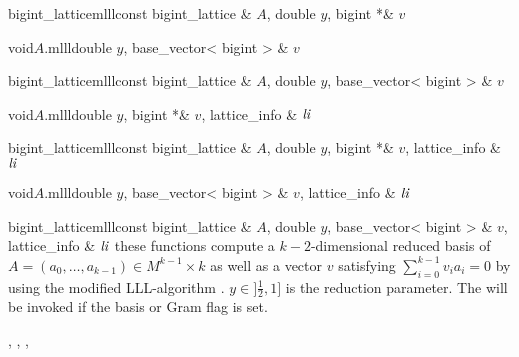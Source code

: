\begin{fcode}{bigint_lattice}{mlll}{const bigint_lattice & $A$, double $y$, bigint *& $v$}
\end{fcode}

\begin{fcode}{void}{$A$.mlll}{double $y$, base_vector< bigint > & $v$}
\end{fcode}

\begin{fcode}{bigint_lattice}{mlll}{const bigint_lattice & $A$, double $y$, base_vector< bigint > & $v$}
\end{fcode}

\begin{fcode}{void}{$A$.mlll}{double $y$, bigint *& $v$, lattice_info & $\mathit{li}$}
\end{fcode}

\begin{fcode}{bigint_lattice}{mlll}{const bigint_lattice & $A$, double $y$, bigint *& $v$,
    lattice_info & $\mathit{li}$}%
\end{fcode}

\begin{fcode}{void}{$A$.mlll}{double $y$, base_vector< bigint > & $v$, lattice_info & $\mathit{li}$}
\end{fcode}

\begin{fcode}{bigint_lattice}{mlll}{const bigint_lattice & $A$, double $y$,
    base_vector< bigint > & $v$, lattice_info & $\mathit{li}$}%
  these functions compute a $k-2$-dimensional reduced basis of $A = (a_0, \dots, a_{k-1}) \in
  M^{k-1} \times k$ as well as a vector $v$ satisfying $\sum_{i=0}^{k-1} v_i a_i = 0$ by using
  the modified LLL-algorithm \cite{Pohst/Zassenhaus:1989}.  $y\in ]\frac{1}{2},1]$ is the
  reduction parameter.  The \LEH will be invoked if the basis or Gram flag is set.
\end{fcode}



\SEEALSO

, ,
, 



\EXAMPLES

